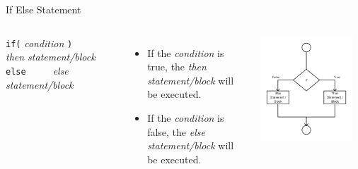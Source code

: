\documentclass[handout]{beamer}
\begin{document}
\begin{frame}[fragile]{If Else Statement}
\begin{columns}
    \verb!if(! \textit{condition} \verb!)! 
    \newline\verb!    ! \textit{then statement/block}
    \newline\verb!else!
    \newline\verb!    ! \textit{else statement/block}

    \vspace{1cm}

    \begin{itemize}[<+(1)->]
        \item If the \textit{condition} is true, the
            \textit{then statement/block} will be executed.
        \item If the \textit{condition} is false, the 
            \textit{else statement/block} will be executed.
    \end{itemize}

    \includegraphics[width=0.9\textwidth]{images/if-else}
\end{columns}
\end{frame}
\end{document}
